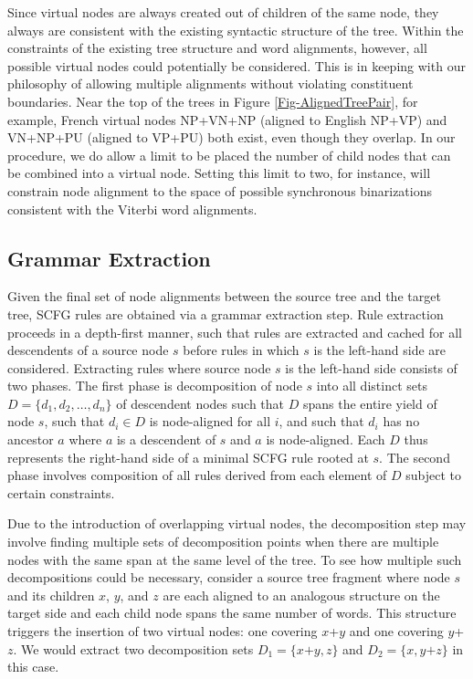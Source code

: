 \documentclass[11pt]{article}
\begin{document}
Since virtual nodes are always created out of children of the same node, they always are consistent with the existing syntactic structure of the tree.  Within the constraints of the existing tree structure and word alignments, however, all possible virtual nodes could potentially be considered.  This is in keeping with our philosophy of allowing multiple alignments without violating constituent boundaries.  Near the top of the trees in Figure \ref{Fig-AlignedTreePair}, for example, French virtual nodes NP+VN+NP (aligned to English NP+VP) and VN+NP+PU (aligned to VP+PU) both exist, even though they overlap.  In our procedure, we do allow a limit to be placed the number of child nodes that can be combined into a virtual node.  Setting this limit to two, for instance, will constrain node alignment to the space of possible synchronous binarizations consistent with the Viterbi word alignments.

\subsection{Grammar Extraction}

Given the final set of node alignments between the source tree and the target tree, SCFG rules are obtained via a grammar extraction step.  Rule extraction proceeds in a depth-first manner, such that rules are extracted and cached for all descendents of a source node $s$ before rules in which $s$ is the left-hand side are considered. Extracting rules where source node $s$ is the left-hand side consists of two phases.  The first phase is decomposition of node $s$ into all distinct sets $D = \{d_1, d_2, \ldots, d_n\}$ of descendent nodes such that $D$ spans the entire yield of node $s$, such that $d_i \in D$ is node-aligned for all $i$, and such that $d_i$ has no ancestor $a$ where $a$ is a descendent of $s$ and $a$ is node-aligned.  Each $D$ thus represents the right-hand side of a minimal SCFG rule rooted at $s$.  The second phase involves composition of all rules derived from each element of $D$ subject to certain constraints.

Due to the introduction of overlapping virtual nodes, the decomposition step may involve finding multiple sets of decomposition points when there are multiple nodes with the same span at the same level of the tree.  To see how multiple such decompositions could be necessary, consider a source tree fragment where node $s$ and its children $x$, $y$, and $z$ are each aligned to an analogous structure on the target side and each child node spans the same number of words.  This structure triggers the insertion of two virtual nodes: one covering $x$+$y$ and one covering $y$+$z$.  We would extract two decomposition sets $D_1 = \{x\text{+}y, z\}$ and $D_2 = \{x, y\text{+}z\}$ in this case.
\end{document}
